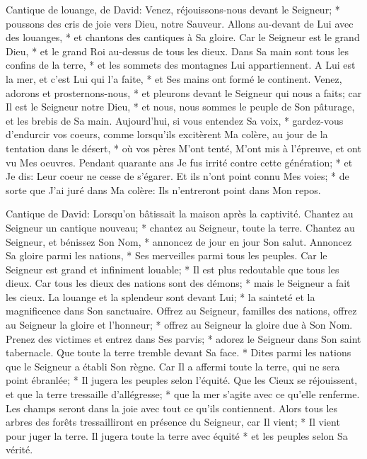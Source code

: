 Cantique de louange, de David: Venez, réjouissons-nous devant le Seigneur; * poussons des cris de joie vers Dieu, notre Sauveur.
Allons au-devant de Lui avec des louanges, * et chantons des cantiques à Sa gloire.
Car le Seigneur est le grand Dieu, * et le grand Roi au-dessus de tous les dieux.
Dans Sa main sont tous les confins de la terre, * et les sommets des montagnes Lui appartiennent.
A Lui est la mer, et c'est Lui qui l'a faite, * et Ses mains ont formé le continent.
Venez, adorons et prosternons-nous, * et pleurons devant le Seigneur qui nous a faits;
car Il est le Seigneur notre Dieu, * et nous, nous sommes le peuple de Son pâturage, et les brebis de Sa main.
Aujourd'hui, si vous entendez Sa voix, * gardez-vous d'endurcir vos coeurs,
comme lorsqu'ils excitèrent Ma colère, au jour de la tentation dans le désert, * où vos pères M'ont tenté, M'ont mis à l'épreuve, et ont vu Mes oeuvres.
Pendant quarante ans Je fus irrité contre cette génération; * et Je dis: Leur coeur ne cesse de s'égarer.
Et ils n'ont point connu Mes voies; * de sorte que J'ai juré dans Ma colère: Ils n'entreront point dans Mon repos.

Cantique de David: Lorsqu'on bâtissait la maison après la captivité. Chantez au Seigneur un cantique nouveau; * chantez au Seigneur, toute la terre.
Chantez au Seigneur, et bénissez Son Nom, * annoncez de jour en jour Son salut.
Annoncez Sa gloire parmi les nations, * Ses merveilles parmi tous les peuples.
Car le Seigneur est grand et infiniment louable; * Il est plus redoutable que tous les dieux.
Car tous les dieux des nations sont des démons; * mais le Seigneur a fait les cieux.
La louange et la splendeur sont devant Lui; * la sainteté et la magnificence dans Son sanctuaire.
Offrez au Seigneur, familles des nations, offrez au Seigneur la gloire et l'honneur; *
offrez au Seigneur la gloire due à Son Nom. Prenez des victimes et entrez dans Ses parvis; *
adorez le Seigneur dans Son saint tabernacle. Que toute la terre tremble devant Sa face. *
Dites parmi les nations que le Seigneur a établi Son règne. Car Il a affermi toute la terre, qui ne sera point ébranlée; * Il jugera les peuples selon l'équité.
Que les Cieux se réjouissent, et que la terre tressaille d'allégresse; * que la mer s'agite avec ce qu'elle renferme.
Les champs seront dans la joie avec tout ce qu'ils contiennent. Alors tous les arbres des forêts tressailliront
en présence du Seigneur, car Il vient; * Il vient pour juger la terre. Il jugera toute la terre avec équité * et les peuples selon Sa vérité.

